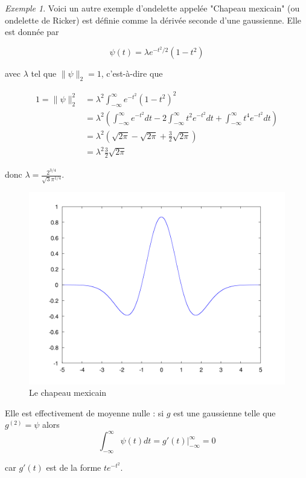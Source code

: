 \documentclass[]{article}
\theoremstyle{remark}
\newtheorem{myexmpl}{Exemple}
\theoremstyle{definition}
\newcommand{\DS}{\displaystyle}
\begin{document}
	\begin{myexmpl}
		Voici un autre exemple d'ondelette appelée "Chapeau mexicain" (ou ondelette de Ricker) est définie comme la dérivée seconde d'une gaussienne. Elle est donnée par 
		
		$$\psi(t) = \lambda e^{-t^2/2} (1 - t^2)$$
		
		avec $\lambda$ tel que $\|\psi\|_2 = 1$, c'est-à-dire que
		
		\begin{align*}
			1 = \|\psi\|_2^2 &= \lambda^2 \int_{- \infty}^{\infty} e^{-t^2} (1-t^2)^2 \\
			&= \lambda^2 \left(\int_{-\infty}^{\infty} e^{-t^2} dt - 2 \int_{-\infty}^{\infty} t^2 e^{-t^2} dt + \int_{-\infty}^{\infty} t^4 e^{-t^2} dt\right) \\
			&= \lambda^2 \left(\sqrt{2 \pi} - \sqrt{2 \pi} + \frac{3}{2} \sqrt{2 \pi}\right) \\
			&= \lambda^2 \frac{3}{2} \sqrt{2 \pi}
		\end{align*}
		
		donc $\DS \lambda = \frac{2^{3/4}}{\sqrt{3} \pi^{1/4}}$.
		
		\begin{figure}[h]
			\centering
			\includegraphics[width=350pt]{Mexican_Hat.png}
			\caption{Le chapeau mexicain}
		\end{figure}
	
		Elle est effectivement de moyenne nulle : si $g$ est une gaussienne telle que $g^{(2)}= \psi$ alors $$\int_{-\infty}^{\infty} \psi(t) dt = g'(t) \bigg\vert_{-\infty}^{\infty} = 0$$

		car $g'(t)$ est de la forme $t e^{-t^2}$.
	\end{myexmpl}
	
\end{document}
